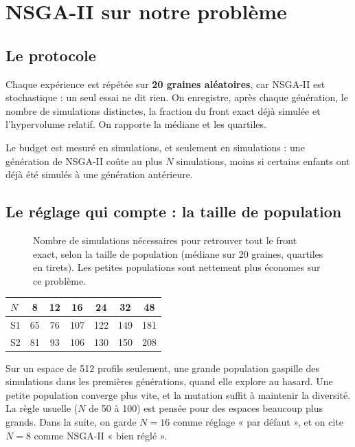 \chapter{NSGA-II sur notre problème}\label{ch:nsga-res}

\section{Le protocole}
Chaque expérience est répétée sur \textbf{20 graines aléatoires}, car NSGA-II est stochastique : un seul essai ne dit rien. On enregistre, après chaque génération, le nombre de simulations distinctes, la fraction du front exact déjà simulée et l'hypervolume relatif. On rapporte la médiane et les quartiles.

Le budget est mesuré en simulations, et seulement en simulations : une génération de NSGA-II coûte au plus $N$ simulations, moins si certains enfants ont déjà été simulés à une génération antérieure.

\section{Le réglage qui compte : la taille de population}
\begin{figure}[htbp]
\centering

\caption{Nombre de simulations nécessaires pour retrouver tout le front exact, selon la taille de population (médiane sur 20 graines, quartiles en tirets). Les petites populations sont nettement plus économes sur ce problème.}\label{fig:population}
\end{figure}

\begin{center}
\begin{tabular}{lcccccc}
\toprule
$N$ & 8 & 12 & 16 & 24 & 32 & 48 \\
\midrule
S1 & 65 & 76 & 107 & 122 & 149 & 181 \\
S2 & 81 & 93 & 106 & 130 & 150 & 208 \\
\bottomrule
\end{tabular}
\end{center}

Sur un espace de 512 profils seulement, une grande population gaspille des simulations dans les premières générations, quand elle explore au hasard. Une petite population converge plus vite, et la mutation suffit à maintenir la diversité. La règle usuelle ($N$ de 50 à 100) est pensée pour des espaces beaucoup plus grands. Dans la suite, on garde $N=16$ comme réglage « par défaut », et on cite $N=8$ comme NSGA-II « bien réglé ».

